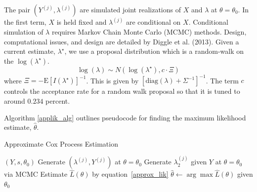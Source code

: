 \documentclass{acm_proc_article-sp}
\begin{document}
The pair $(Y^{(j)}, \lambda^{(j)})$ are simulated joint realizations of $X$ and $\lambda$ at $\theta = \theta_0$.  In the first term, $X$ is held fixed and $\lambda^{(j)}$ are conditional on $X$.  Conditional simulation of $\lambda$ requires Markov Chain Monte Carlo (MCMC) methods.  Design, computational issues, and design are detailed by Diggle et al. (2013).  Given a current estimate, $\lambda^\star$, we use a proposal distribution which is a random-walk on the $\log (\lambda^\star)$.
\begin{equation*}
\log (\lambda) \sim N \left( \log \left( \lambda^\star\right) , c \cdot \Xi \right)
\end{equation*}
where $\Xi = - \text{E} \left[ I(\lambda^\star) \right]^{-1}$.  This is given by $\left[ \text{diag} \left( \lambda \right) + \Sigma^{-1} \right]^{-1}$.  The term $c$ controls the acceptance rate for a random walk proposal so that it is tuned to around $0.234$ percent.

Algorithm \ref{applik_alg} outlines pseudocode for finding the maximum likelihood estimate, $\hat{\theta}$.

\begin{algorithm}[!h]
\caption{Approximate Cox Process Estimation} \label{applik_alg}
\begin{algorithmic}
$(Y, s, \theta_0)$
\STATE Generate $(\lambda^{(j)}, Y^{(j)})$ at $\theta = \theta_0$
\STATE Generate $\lambda_2^{(j)}$ given $Y$ at $\theta = \theta_0$ via MCMC
\ENDFOR
\STATE Estimate $\hat{L} (\theta)$ by equation~\eqref{approx_lik}
\STATE $\hat{\theta} \gets \arg \max \hat{L} (\theta)$ given $\theta_0$
\end{algorithmic}
\end{algorithm}
\end{document}
